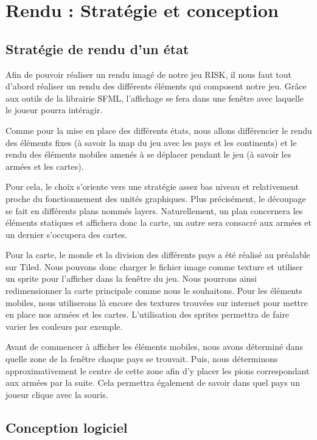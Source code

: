 \section{Rendu : Stratégie et conception}

\subsection{Stratégie de rendu d'un état}

Afin de pouvoir réaliser un rendu imagé de notre jeu RISK, il nous faut tout d’abord réaliser un rendu des différents éléments qui composent notre jeu. Grâce aux outils de la librairie SFML, l'affichage se fera dans une fenêtre avec laquelle le joueur pourra intéragir. 

Comme pour la mise en place des différents états, nous allons différencier le rendu des éléments fixes (à savoir la map du jeu avec les pays et les continents) et le rendu des éléments mobiles amenés à se déplacer pendant le jeu (à savoir les armées et les cartes). 

Pour cela, le choix s'oriente vers une stratégie assez bas niveau et relativement proche du fonctionnement des unités graphiques. Plus précisément, le découpage se fait en différents plans nommés layers. Naturellement, un plan concernera les éléments statiques et affichera donc la carte, un autre sera consacré aux armées et un dernier s'occupera des cartes.

Pour la carte, le monde et la division des différents pays a été réalisé au préalable sur Tiled. Nous pouvons donc charger le fichier image comme texture et utiliser un sprite pour l'afficher dans la fenêtre du jeu. Nous pourrons ainsi redimensionner la carte principale comme nous le souhaitons.
Pour les éléments mobiles, nous utiliserons là encore des textures trouvées sur internet pour mettre en place nos armées et les cartes. L'utilisation des sprites permettra de faire varier les couleurs par exemple. 

Avant de commencer à afficher les éléments mobiles, nous avons déterminé dans quelle zone de la fenêtre chaque pays se trouvait. Puis, nous déterminons approximativement le centre de cette zone afin d'y placer les pions correspondant aux armées par la suite. Cela permettra également de savoir dans quel pays un joueur clique avec la souris. 


\subsection{Conception logiciel}

